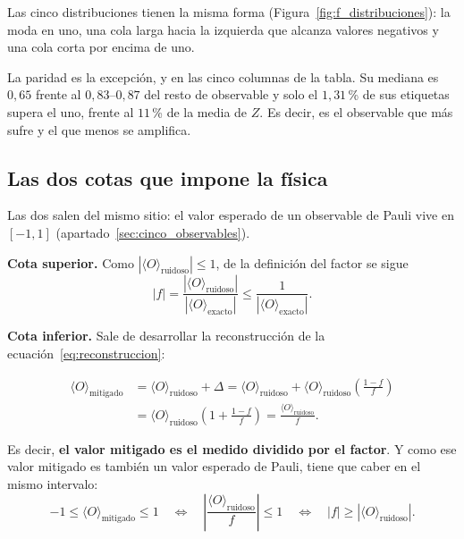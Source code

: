 Las cinco distribuciones tienen la misma forma (Figura~\ref{fig:f_distribuciones}): la moda
en uno, una cola larga hacia la izquierda que alcanza valores negativos y una cola corta por encima de uno.

La paridad es la excepción, y en las cinco columnas de la tabla. Su mediana es $0{,}65$
frente al $0{,}83$--$0{,}87$ del resto de observable y solo el
$1{,}31$\,\% de sus etiquetas supera el uno, frente al $11$\,\% de la media de $Z$. Es decir, es el observable que más sufre y el que menos se amplifica.

\subsection{Las dos cotas que impone la física}
\label{sec:cotas}

Las dos salen del mismo sitio: el valor esperado de un observable de Pauli vive en $[-1,1]$
(apartado~\ref{sec:cinco_observables}).

\textbf{Cota superior.} Como $|\langle O\rangle_{\text{ruidoso}}| \le 1$, de la definición del factor se sigue
\begin{equation}
\label{eq:cota_superior}
|f| = \frac{|\langle O\rangle_{\text{ruidoso}}|}{|\langle O\rangle_{\text{exacto}}|} \le \frac{1}{|\langle O\rangle_{\text{exacto}}|} .
\end{equation}

\textbf{Cota inferior.} Sale de desarrollar la reconstrucción de la
ecuación~\eqref{eq:reconstruccion}:

\begin{equation}
\label{eq:mitigado_desarrollo}
\begin{split}
\langle O\rangle_{\text{mitigado}} &= \langle O\rangle_{\text{ruidoso}} + \Delta = \langle O\rangle_{\text{ruidoso}} + \langle O\rangle_{\text{ruidoso}} \left(\frac{1-f}{f}\right) \\
&= \langle O\rangle_{\text{ruidoso}} \left(1 + \frac{1-f}{f}\right) = \frac{\langle O\rangle_{\text{ruidoso}}}{f} .
\end{split}
\end{equation}

\noindent Es decir, \textbf{el valor mitigado es el medido dividido por el factor}. Y como ese
valor mitigado es también un valor esperado de Pauli, tiene que caber en el mismo intervalo:
\begin{equation}
\label{eq:cota_inferior}
-1 \le \langle O\rangle_{\text{mitigado}} \le 1
\quad \Longleftrightarrow \quad \left|\frac{\langle O\rangle_{\text{ruidoso}}}{f}\right| \le 1
\quad \Longleftrightarrow \quad |f| \ge |\langle O\rangle_{\text{ruidoso}}| .
\end{equation}

